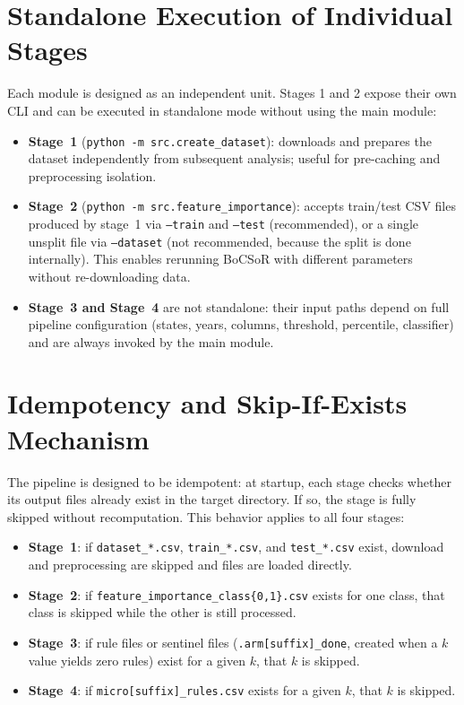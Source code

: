\section{Standalone Execution of Individual Stages}
\label{app:standalone}

Each module is designed as an independent unit.
Stages 1 and 2 expose their own CLI and can be executed in standalone mode without using the main module:

\begin{itemize}
  \item \textbf{Stage~1} (\texttt{python -m src.create\_dataset}): downloads and prepares the dataset independently from subsequent analysis; useful for pre-caching and preprocessing isolation.
  \item \textbf{Stage~2} (\texttt{python -m src.feature\_importance}): accepts train/test CSV files produced by stage~1 via \texttt{--train} and \texttt{--test} (recommended), or a single unsplit file via \texttt{--dataset} (not recommended, because the split is done internally).
  This enables rerunning BoCSoR with different parameters without re-downloading data.
  \item \textbf{Stage~3 and Stage~4} are not standalone: their input paths depend on full pipeline configuration (states, years, columns, threshold, percentile, classifier) and are always invoked by the main module.
\end{itemize}

\section{Idempotency and Skip-If-Exists Mechanism}
\label{app:skip-if-exists}

The pipeline is designed to be idempotent: at startup, each stage checks whether its output files already exist in the target directory.
If so, the stage is fully skipped without recomputation.
This behavior applies to all four stages:

\begin{itemize}
  \item \textbf{Stage~1}: if \texttt{dataset\_*.csv}, \texttt{train\_*.csv}, and \texttt{test\_*.csv} exist, download and preprocessing are skipped and files are loaded directly.
  \item \textbf{Stage~2}: if \texttt{feature\_importance\_class\{0,1\}.csv} exists for one class, that class is skipped while the other is still processed.
  \item \textbf{Stage~3}: if rule files or sentinel files (\texttt{.arm[suffix]\_done}, created when a $k$ value yields zero rules) exist for a given $k$, that $k$ is skipped.
  \item \textbf{Stage~4}: if \texttt{micro[suffix]\_rules.csv} exists for a given $k$, that $k$ is skipped.
\end{itemize}

